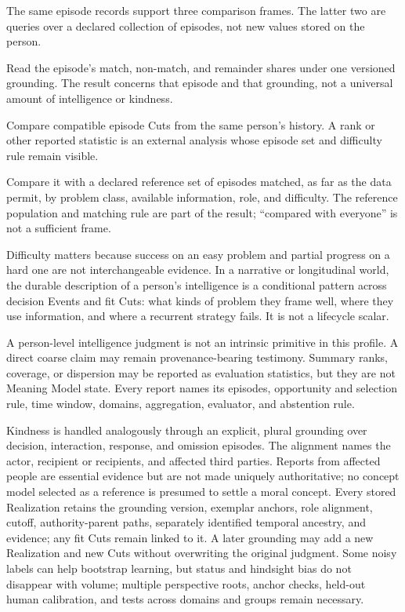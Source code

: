 \documentclass[10pt]{article}
\begin{document}
The same episode records support three comparison frames. The latter two are
queries over a declared collection of episodes, not new values stored on the
person.

\begin{description}[leftmargin=2.7cm,style=nextline]
  \item[Criterion.] Read the episode's match, non-match, and remainder shares
    under one versioned grounding. The result concerns that episode and that
    grounding, not a universal amount of intelligence or kindness.
  \item[Ipsative.] Compare compatible episode Cuts from the same person's
    history. A rank or other reported statistic is an external analysis whose
    episode set and difficulty rule remain visible.
  \item[Norm-referenced.] Compare it with a declared reference set of episodes
    matched, as far as the data permit, by problem class, available information,
    role, and difficulty. The reference population and matching rule are part
    of the result; ``compared with everyone'' is not a sufficient frame.
\end{description}

Difficulty matters because success on an easy problem and partial progress on
a hard one are not interchangeable evidence. In a narrative or longitudinal
world, the durable description of a person's intelligence is a conditional pattern across
decision Events and fit Cuts: what kinds of problem they frame well, where they
use information, and where a recurrent strategy fails. It is not a lifecycle
scalar.

A person-level intelligence judgment is not an intrinsic primitive in this
profile. A direct coarse claim may remain provenance-bearing testimony. Summary
ranks, coverage, or dispersion may be reported as evaluation statistics, but
they are not Meaning Model state. Every report names its episodes, opportunity
and selection rule, time window, domains, aggregation, evaluator, and abstention
rule.

Kindness is handled analogously through an explicit, plural grounding over
decision, interaction, response, and omission episodes. The alignment names
the actor, recipient or recipients, and affected third parties. Reports from
affected people are essential evidence but are not made uniquely authoritative;
no concept model selected as a reference is presumed to settle a moral concept. Every stored
Realization retains the grounding version, exemplar anchors, role alignment,
cutoff, authority-parent paths, separately identified temporal ancestry, and evidence; any fit Cuts remain linked
to it. A later grounding
may add a new Realization and new Cuts without overwriting the original
judgment. Some noisy labels can help bootstrap learning, but status and
hindsight bias do not disappear with volume;
multiple perspective roots, anchor checks, held-out human calibration, and tests across
domains and groups remain necessary.
\end{document}
